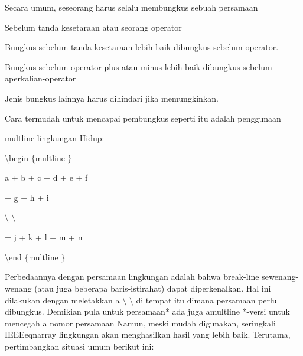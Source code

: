  Secara umum, seseorang harus selalu membungkus sebuah persamaan \par
\noindent 
 Sebelum tanda kesetaraan atau seorang operator \par
\noindent 
 Bungkus sebelum tanda kesetaraan lebih baik dibungkus sebelum operator. \par
Bungkus sebelum operator plus atau minus lebih baik dibungkus sebelum aperkalian-operator \par
\noindent 
 Jenis bungkus lainnya harus dihindari jika memungkinkan.
 \par
\vspace{12pt}
\vspace{12pt}
\noindent 
Cara termudah untuk mencapai pembungkus seperti itu adalah penggunaan \par
\noindent 
multline-lingkungan Hidup: \par
\vspace{12pt}
\noindent 
 $  \setminus  $begin $  \{  $multline $  \}  $ \par
\vspace{12pt}
\noindent 
a + b + c + d + e + f \par
\vspace{12pt}
\noindent 
+ g + h + i \par
\vspace{12pt}
\noindent 
 $  \setminus  $ $  \setminus  $ \par
\vspace{12pt}
\noindent 
= j + k + l + m + n \par
\vspace{12pt}
\noindent 
 $  \setminus  $end $  \{  $multline $  \}  $ \par
\vspace{12pt}
\noindent 
 \hspace*{0.5in} Perbedaannya dengan persamaan lingkungan adalah bahwa break-line sewenang-wenang (atau juga beberapa baris-istirahat) dapat diperkenalkan. Hal ini dilakukan dengan meletakkan a $  \setminus  $ $  \setminus  $ di tempat itu dimana persamaan perlu dibungkus. Demikian pula untuk persamaan* ada juga amultline *-versi untuk mencegah a nomor persamaan Namun, meski mudah digunakan, seringkali IEEEeqnarray lingkungan akan menghasilkan hasil yang lebih baik. Terutama, pertimbangkan situasi umum berikut ini: \par
 
